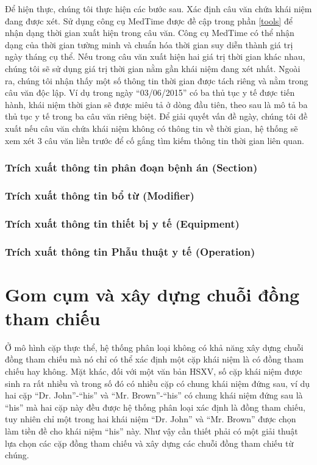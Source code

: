 Để hiện thực, chúng tôi thực hiện các bước sau. Xác định câu văn chứa khái niệm đang được xét. Sử dụng công cụ MedTime được đề cập trong phần \ref{tools} để nhận dạng thời gian xuất hiện trong câu văn. Công cụ MedTime có thể nhận dạng của thời gian tường minh và chuẩn hóa thời gian suy diễn thành giá trị ngày tháng cụ thể. Nếu trong câu văn xuất hiện hai giá trị thời gian khác nhau, chúng tôi sẽ sử dụng giá trị thời gian nằm gần khái niệm đang xét nhất. Ngoài ra, chúng tôi nhận thấy một số thông tin thời gian được tách riêng và nằm trong câu văn độc lập. Ví dụ trong ngày ``03/06/2015'' có ba thủ tục y tế được tiến hành, khái niệm thời gian sẽ được miêu tả ở dòng đầu tiên, theo sau là mô tả ba thủ tục y tế trong ba câu văn riêng biệt. Để giải quyết vấn đề ngày, chúng tôi đề xuất nếu câu văn chứa khái niệm không có thông tin về thời gian, hệ thống sẽ xem xét 3 câu văn liền trước để cố gắng tìm kiếm thông tin thời gian liên quan.

\subsubsection*{Trích xuất thông tin phân đoạn bệnh án (Section)}

\subsubsection*{Trích xuất thông tin bổ từ (Modifier)}

\subsubsection*{Trích xuất thông tin thiết bị y tế (Equipment)}

\subsubsection*{Trích xuất thông tin Phẫu thuật y tế (Operation)}

\section{Gom cụm và xây dựng chuỗi đồng tham chiếu}
Ở mô hình cặp thực thể, hệ thống phân loại không có khả năng xây dựng chuỗi đồng tham chiếu mà nó chỉ có thể xác định một cặp khái niệm là có đồng tham chiếu hay không. Mặt khác, đối với một văn bản HSXV, số cặp khái niệm được sinh ra rất nhiều và trong số đó có nhiều cặp có chung khái niệm đứng sau, ví dụ hai cặp “Dr. John”-“his” và “Mr. Brown”-“his” có chung khái niệm đứng sau là “his” mà hai cặp này đều được hệ thống phân loại xác định là đồng tham chiếu, tuy nhiên chỉ một trong hai khái niệm “Dr. John” và “Mr. Brown” được chọn làm tiền đề cho khái niệm “his” này. Như vậy cần thiết phải có một giải thuật lựa chọn các cặp đồng tham chiếu và xây dựng các chuỗi đồng tham chiếu từ chúng.

